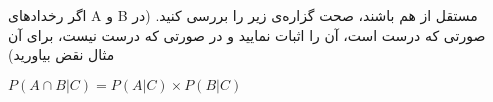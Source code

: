 اگر رخدادهای A و B مستقل از هم باشند، صحت گزاره‌ی زیر را بررسی کنید. (در صورتی که درست است، آن را اثبات نمایید و در صورتی که درست نیست، برای آن مثال نقض بیاورید)

$P(A \cap B | C) = P(A | C) \times P(B | C)$